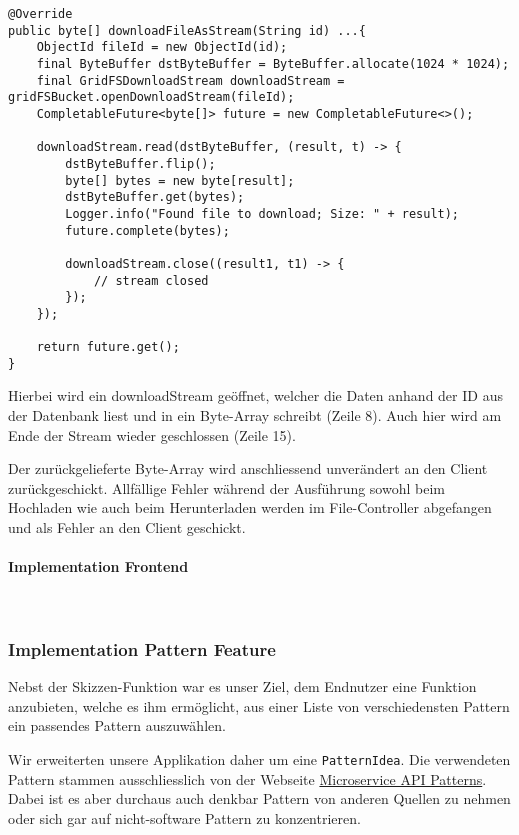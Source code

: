 \begin{lstlisting}[caption={Download File im DB Service}, label=uploadFileDBService]
@Override
public byte[] downloadFileAsStream(String id) ...{
    ObjectId fileId = new ObjectId(id);
    final ByteBuffer dstByteBuffer = ByteBuffer.allocate(1024 * 1024);
    final GridFSDownloadStream downloadStream = gridFSBucket.openDownloadStream(fileId);
    CompletableFuture<byte[]> future = new CompletableFuture<>();

    downloadStream.read(dstByteBuffer, (result, t) -> {
        dstByteBuffer.flip();
        byte[] bytes = new byte[result];
        dstByteBuffer.get(bytes);
        Logger.info("Found file to download; Size: " + result);
        future.complete(bytes);

        downloadStream.close((result1, t1) -> {
            // stream closed
        });
    });

    return future.get();
}
\end{lstlisting}

Hierbei wird ein downloadStream geöffnet, welcher die Daten anhand der ID aus der Datenbank liest und in ein Byte-Array schreibt (Zeile 8). Auch hier wird am Ende der Stream wieder geschlossen (Zeile 15).

Der zurückgelieferte Byte-Array wird anschliessend unverändert an den Client zurück\-geschickt. Allfällige Fehler während der Ausführung sowohl beim Hochladen wie auch beim Herunterladen werden im File-Controller abgefangen und als Fehler an den Client geschickt.

\paragraph*{Implementation Frontend}~\\

\subsubsection{Implementation Pattern Feature}
Nebst der Skizzen-Funktion war es unser Ziel, dem Endnutzer eine Funktion anzubieten, welche es ihm ermöglicht, aus einer Liste von verschiedensten Pattern ein passendes Pattern auszuwählen. 

Wir erweiterten unsere Applikation daher um eine \texttt{PatternIdea}. Die verwendeten Pattern stammen ausschliesslich von der Webseite \href{https://microservice-api-patterns.org}{Microservice API Patterns}. Dabei ist es aber durchaus auch denkbar Pattern von anderen Quellen zu nehmen oder sich gar auf nicht-software Pattern zu konzentrieren.

